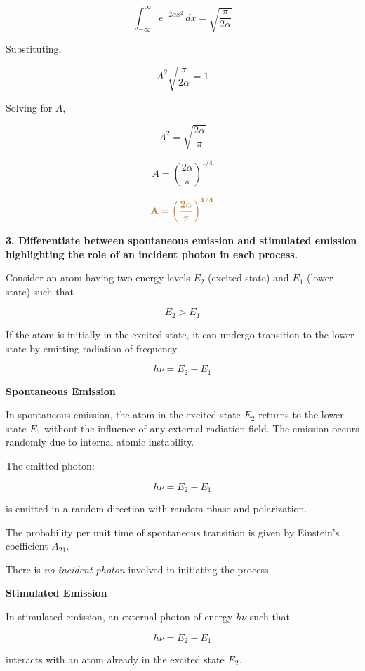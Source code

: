 \documentclass[a4paper, 12pt]{article}
\begin{document}
\[
\int_{-\infty}^{\infty} e^{-2\alpha x^{2}} \, dx
=
\sqrt{\frac{\pi}{2\alpha}}
\]

Substituting,

\[
A^{2} \sqrt{\frac{\pi}{2\alpha}} = 1
\]

Solving for $A$,

\[
A^{2} = \sqrt{\frac{2\alpha}{\pi}}
\]

\[
A = \left( \frac{2\alpha}{\pi} \right)^{1/4}
\]

\[
\textcolor{brown}{\mathbf{A = \left( \dfrac{2\alpha}{\pi} \right)^{1/4}}}
\]




\textbf{3. Differentiate between spontaneous emission and stimulated emission highlighting the role of an incident photon in each process.}

\vspace{0.3cm}

Consider an atom having two energy levels $E_2$ (excited state) and $E_1$ (lower state) such that

\[
E_2 > E_1
\]

If the atom is initially in the excited state, it can undergo transition to the lower state by emitting radiation of frequency

\[
h\nu = E_2 - E_1
\]

\textbf{Spontaneous Emission}

In spontaneous emission, the atom in the excited state $E_2$ returns to the lower state $E_1$ without the influence of any external radiation field. The emission occurs randomly due to internal atomic instability.

The emitted photon:

\[
h\nu = E_2 - E_1
\]

is emitted in a random direction with random phase and polarization.

The probability per unit time of spontaneous transition is given by Einstein’s coefficient $A_{21}$.

There is \emph{no incident photon} involved in initiating the process.

\vspace{0.4cm}

\textbf{Stimulated Emission}

In stimulated emission, an external photon of energy $h\nu$ such that

\[
h\nu = E_2 - E_1
\]

interacts with an atom already in the excited state $E_2$.
\end{document}
